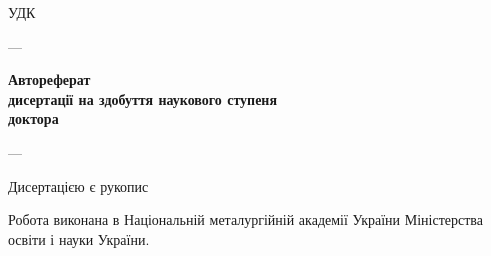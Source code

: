\documentclass[a4paper,12pt]{atuaref}
\author{\dissauthorFullAref}
\title{\booknameUa}
\date{\bookyear}
\begin{document}
\sloppy

\thispagestyle{empty}
\begin{center}

\textbf{\belongAref}

\vspace{1ex}

\textbf{\institutionAref}

\vspace{3ex}

\textbf{\dissauthorFullAref}

\end{center}

\vspace{3ex}

\begin{flushright}
УДК \UDC
\end{flushright}

\vfill

\begin{center}
\textbf{\Large
\booknameUa
}

\vfill

\dissSpecId --- \dissSpecAref

\vfill

\textbf{Автореферат} \\
\textbf{  дисертації на здобуття наукового ступеня }\\
\textbf{доктора \dissScopeAref }


\vfill

\cityAref --- \bookyear

\end{center}

\clearpage

\thispagestyle{empty}

\noindent
Дисертацією є рукопис

\vspace{3ex plus 2ex}

\noindent
Робота виконана в Національній металургійній академії України
Міністерства освіти і науки України.


\vspace{4ex plus 4ex}
\end{document}
